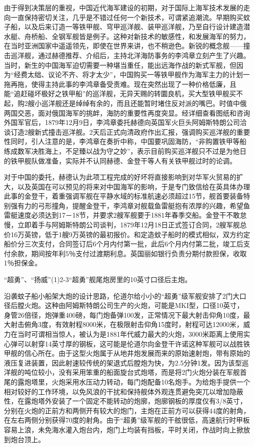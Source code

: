 \documentclass[12pt,UTF8]{ctexbook}
\begin{document}
由于得到决策层的重视，中国近代海军建设的初期，对于国际上海军技术发展的走向一直保持密切关注，几乎是不错过任何一个新技术，可谓紧追潮流。早期购买蚊子船，以及后来订造一等铁甲舰、穹甲巡洋舰、装甲巡洋舰，乃至自行设计建造潜水艇、舟桥船、全钢军舰皆是例子。这种对新技术的敏感性，和发展海军的努力，在当时亚洲国家中遥遥领先，即使在世界来讲，也不稍逊色。新锐的概念舰——撞击巡洋舰，通过赫德推荐、介绍后，主持北洋海防事务的李鸿章立刻产生了兴趣。当时，新生的中国海军迫切需要一种堪当重任，能出远海作战的新式军舰，但因为“经费太绌、议论不齐、将才太少”，中国购买一等铁甲舰作为海军主力的计划一拖再拖，使得主持此事的李鸿章备受责难。现在突然出现了一种价格低廉，且能“追赶碰坏极好之铁甲船”的巡洋舰，无异天赐的转圜良机，买大型铁甲舰买不起，购2艘小巡洋舰还是绰绰有余的，而且还能暂时堵住反对派的嘴巴。时值中俄两国交恶，面对俄国海军的挑衅，海防的重要性再度突显。经详细查看图纸和咨询外国军官后，1879年12月9日，李鸿章委托赫德向英国军火巨头阿姆斯特朗公司洽谈订造2艘新式撞击巡洋舰。2天后正式向清政府作出汇报，强调购买巡洋舰的重要性同时，引人注意的是，李鸿章在奏折中称，中国要巩固海防，“非购置铁甲等船练成数军决胜海上，不足臻以战为守之妙”，表示目前购买巡洋舰只不过是为他日的铁甲舰队做准备，实际并不认同赫德、金登干等人有关铁甲舰过时的论调。

对于中国的委托，赫德认为此项工程完成的好坏将直接影响到对华军火贸易的扩大，以及英国在可以预见的将来对中国海军的影响，于是专门致信给在英具体办理此事的金登干，着重强调军舰在平静水域的标准航速必须超过15节，舰首要装备特别强有力的弓形撞角，提醒金登干，李鸿章对舰载鱼雷艇抱有浓厚的兴趣，希望鱼雷艇速度必须达到17－18节，并要求2艘军舰要于1881年春季交船。金登干不敢怠慢，立即着手与阿姆斯特朗公司谈判，1879年12月18日正式签订合同，2艘军舰总价16万英镑，低于1艘9万英镑的最初报价。和定造蚊子船时的模式相似，双方约定船价分三次支付，合同签订后6个月内付第一批，此后6个月内付第二批，竣工后支付余款，期间按年利5％支付过渡期利息。英国丽如银行负责分期付款担保，收取1％担保金。

“超勇”、“扬威”(1)2-3“超勇”舰尾炮房里的10英寸口径后主炮。

沿袭蚊子船小船架大炮的设计思路，伦道尔给小小的“超勇”级军舰安排了2门大口径后膛火炮。这种由阿姆斯特朗公司生产的火炮，可能是MKI型，口径10英寸，身管26倍径，炮弹重400磅，每门炮备弹100发，正常情况下最大射击仰角10度，最大射击俯角3度，有效射程8000米，在极限射击仰角15度时，射程可达12000米，威力在当时可谓相当惊人，被认为是1881年代威力最大的火炮，3000米距离上使用实心弹可以射穿14英寸厚的钢板，这可能是伦道尔向金登干许诺这种军舰可以战胜铁甲舰的信心所在。由于这型火炮属于从地井炮发展而来的原始速射炮，带有原始的液压复进装置，因此射速较传统的架退式后膛炮为快，为2.5分钟1发。因为该型巡洋舰的吨位较小，没有采用笨重的船面旋台式炮塔，而是将2门火炮分装在军舰首尾的露炮塔里，火炮采用水压动力转动，每门炮配备10名炮手。为给炮手提供一个相对较好的工作环境，以免风浪的干扰和保持舰体外观连贯避免突兀以增加隐蔽性，在露炮塔外安装了一个固定不能转动的炮廓，炮廓钢板的厚度仅有3/8英寸，分别在火炮的正前方和两侧开有较大的炮门，主炮在正前方可以获得44度的射角，在左右两侧分别获得70度的射角。由于“超勇”级军舰的干舷很低，高速航行时甲板容易上浪，未免海水灌入炮台内，炮门上均装有挡板，平时关闭，作战时向上掀放到炮台顶上。
\end{document}
